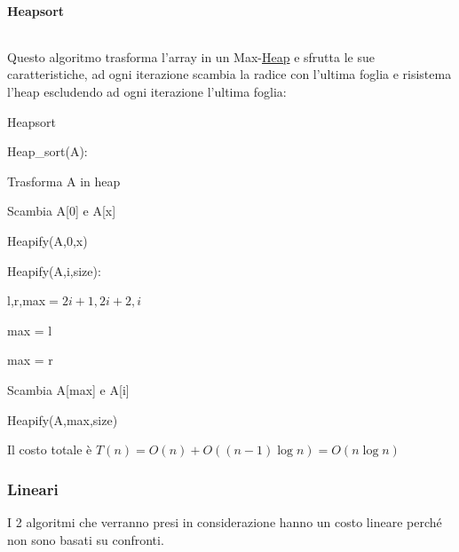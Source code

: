 \documentclass{article}
\begin{document}
\paragraph{Heapsort} $\ $\newline

\noindent Questo algoritmo trasforma l'array in un Max-\hyperref[heap]{Heap} e sfrutta le sue caratteristiche, ad ogni iterazione scambia la radice con l'ultima foglia e risistema l'heap escludendo ad ogni iterazione l'ultima foglia:

\begin{algorithm}[ht]
\caption{Heapsort}
\begin{algorithmic}
\State Heap\_sort(A):

    \State Trasforma A in heap 


        \State Scambia A[0] e A[x]

        \State Heapify(A,0,x)

    \EndFor

\State

\State Heapify(A,i,size): 

    \State l,r,max$=2i+1,2i+2,i$


        \State max = l

    \EndIf


        \State max = r

    \EndIf


        \State Scambia A[max] e A[i]

        \State Heapify(A,max,size)

    \EndIf

\end{algorithmic}
\end{algorithm}

\noindent Il costo totale è $T(n)=O(n)+O((n-1)\log n)=O(n\log n)$

\newpage

\subsubsection{Lineari}

I 2 algoritmi che verranno presi in considerazione hanno un costo lineare perché non sono basati su confronti.\newline
\end{document}
